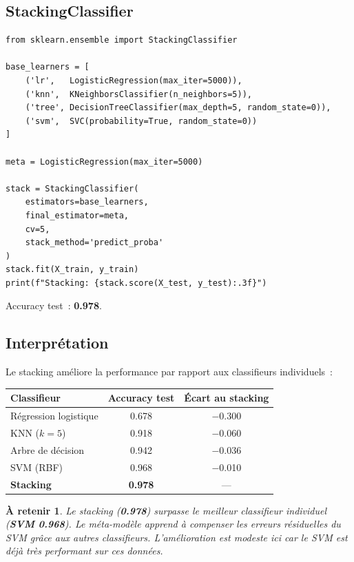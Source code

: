 \documentclass[a4paper,11pt]{article}
\newtheorem*{important}{\`A retenir}
\begin{document}
\subsection{StackingClassifier}

\begin{lstlisting}
from sklearn.ensemble import StackingClassifier

base_learners = [
    ('lr',   LogisticRegression(max_iter=5000)),
    ('knn',  KNeighborsClassifier(n_neighbors=5)),
    ('tree', DecisionTreeClassifier(max_depth=5, random_state=0)),
    ('svm',  SVC(probability=True, random_state=0))
]

meta = LogisticRegression(max_iter=5000)

stack = StackingClassifier(
    estimators=base_learners,
    final_estimator=meta,
    cv=5,
    stack_method='predict_proba'
)
stack.fit(X_train, y_train)
print(f"Stacking: {stack.score(X_test, y_test):.3f}")
\end{lstlisting}

\noindent Accuracy test~: \textbf{0.978}.

\subsection{Interpr\'etation}

Le stacking am\'eliore la performance par rapport aux classifieurs
individuels~:

\begin{center}
\begin{tabular}{lcc}
\toprule
Classifieur & Accuracy test & \'Ecart au stacking \\
\midrule
R\'egression logistique & 0.678 & $-$0.300 \\
KNN ($k=5$) & 0.918 & $-$0.060 \\
Arbre de d\'ecision & 0.942 & $-$0.036 \\
SVM (RBF) & 0.968 & $-$0.010 \\
\midrule
\textbf{Stacking} & \textbf{0.978} & --- \\
\bottomrule
\end{tabular}
\end{center}

\begin{important}
Le stacking (\textbf{0.978}) surpasse le meilleur classifieur
individuel (\textbf{SVM 0.968}). Le m\'eta-mod\`ele apprend \`a
compenser les erreurs r\'esiduelles du SVM gr\^ace aux autres
classifieurs. L'am\'elioration est modeste ici car le SVM est
d\'ej\`a tr\`es performant sur ces donn\'ees.
\end{important}
\end{document}
